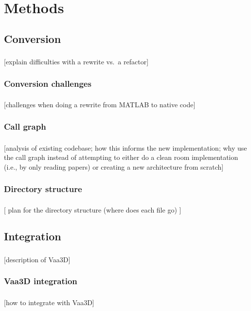 \documentclass{beamer}
\newcommand{\tbackground}[1]{#1}
\newcommand{\tbackground}[1]{\textcolor{tbackground}{#1}}
\begin{document}
\section{Methods}

\subsection{Conversion}
\begin{frame}\frametitle{\subsecname}
	[\tbackground{explain difficulties with a rewrite vs.\ a refactor}]
\end{frame}

\subsubsection{Conversion challenges}
\begin{frame}\frametitle{\subsubsecname}
	[\tbackground{challenges when doing a rewrite from MATLAB to native code}]
\end{frame}

\subsubsection{Call graph}
\begin{frame}\frametitle{\subsubsecname}
	[\tbackground{analysis of existing codebase; how this informs the new
	implementation; why use the call graph instead of
	attempting to either do a clean room implementation (i.e.,
	by only reading papers) or creating a new architecture
	from scratch}]
\end{frame}

\subsubsection{Directory structure}
\begin{frame}\frametitle{\subsubsecname}
	[ plan for the directory structure (where does each file
	go) ]
\end{frame}

\subsection{Integration}
\begin{frame}\frametitle{\subsecname}
	[\tbackground{description of Vaa3D}]
\end{frame}

\subsubsection{Vaa3D integration}
\begin{frame}\frametitle{\subsubsecname}
	[how to integrate with Vaa3D]
\end{frame}
\end{document}
